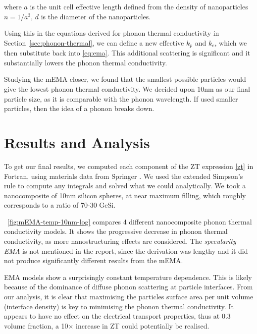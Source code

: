 \documentclass[12pt]{article}
\newcommand{\figref}[2][\figurename~]{#1\ref{#2}}
\newcommand{\secref}[2][Section~]{#1\ref{#2}}
\begin{document}
where $a$ is the unit cell effective length defined from the density of nanoparticles $n = 1 / a^3$, $d$ is the diameter of the nanoparticles.

Using this in the equations derived for phonon thermal conductivity in \secref{sec:phonon-thermal}, we can define a new effective $k_p$ and $k_e$, which we then substitute back into \eqref{eq:ema}. This additional scattering is significant and it substantially lowers the phonon thermal conductivity.

Studying the mEMA closer, we found that the smallest possible particles would give the lowest phonon thermal conductivity. We decided upon 10nm as our final particle size, as it is comparable with the phonon wavelength. If used smaller particles, then the idea of a phonon breaks down.

\section{Results and Analysis}

To get our final results, we computed each component of the ZT expression \eqref{zt} in Fortran, using materials data from Springer \cite{springer}. We used the extended Simpson's rule to compute any integrals and solved what we could analytically. We took a nanocomposite of 10nm silicon spheres, at near maximum filling, which roughly corresponds to a ratio of 70-30 GeSi.

\figref{fig:mEMA-temp-10nm-log} compares 4 different nanocomposite phonon thermal conductivity models. It shows the progressive decrease in phonon thermal conductivity, as more nanostructuring effects are considered. The \emph{specularity EMA} is not mentioned in the report, since the derivation was lengthy and it did not produce significantly different results from the mEMA.


EMA models show a surprisingly constant temperature dependence. This is likely because of the dominance of diffuse phonon scattering at particle interfaces. From our analysis, it is clear that maximising the particles surface area per unit volume (interface density) is key to minimising the phonon thermal conductivity. It appears to have no effect on the electrical transport properties, thus at 0.3 volume fraction, a 10$\times$ increase in ZT could potentially be realised.
\end{document}
